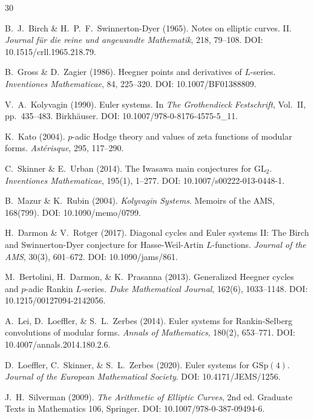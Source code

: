\documentclass[aps,prd,twocolumn,superscriptaddress,nofootinbib]{revtex4-2}
\theoremstyle{definition}
\theoremstyle{remark}
\begin{document}
\begin{thebibliography}{30}

B.~J.~Birch \& H.~P.~F.~Swinnerton-Dyer (1965).
Notes on elliptic curves. II.
\textit{Journal f\"ur die reine und angewandte Mathematik}, 218, 79--108.
DOI: 10.1515/crll.1965.218.79.

B.~Gross \& D.~Zagier (1986).
Heegner points and derivatives of $L$-series.
\textit{Inventiones Mathematicae}, 84, 225--320.
DOI: 10.1007/BF01388809.

V.~A.~Kolyvagin (1990).
Euler systems.
In \textit{The Grothendieck Festschrift}, Vol.~II, pp.\ 435--483. Birkh\"auser.
DOI: 10.1007/978-0-8176-4575-5\_11.

K.~Kato (2004).
$p$-adic Hodge theory and values of zeta functions of modular forms.
\textit{Ast\'erisque}, 295, 117--290.

C.~Skinner \& E.~Urban (2014).
The Iwasawa main conjectures for $\mathrm{GL}_2$.
\textit{Inventiones Mathematicae}, 195(1), 1--277.
DOI: 10.1007/s00222-013-0448-1.

B.~Mazur \& K.~Rubin (2004).
\textit{Kolyvagin Systems}.
Memoirs of the AMS, 168(799).
DOI: 10.1090/memo/0799.

H.~Darmon \& V.~Rotger (2017).
Diagonal cycles and Euler systems II: The Birch and Swinnerton-Dyer conjecture for Hasse-Weil-Artin $L$-functions.
\textit{Journal of the AMS}, 30(3), 601--672.
DOI: 10.1090/jams/861.

M.~Bertolini, H.~Darmon, \& K.~Prasanna (2013).
Generalized Heegner cycles and $p$-adic Rankin $L$-series.
\textit{Duke Mathematical Journal}, 162(6), 1033--1148.
DOI: 10.1215/00127094-2142056.

A.~Lei, D.~Loeffler, \& S.~L.~Zerbes (2014).
Euler systems for Rankin-Selberg convolutions of modular forms.
\textit{Annals of Mathematics}, 180(2), 653--771.
DOI: 10.4007/annals.2014.180.2.6.

D.~Loeffler, C.~Skinner, \& S.~L.~Zerbes (2020).
Euler systems for $\mathrm{GSp}(4)$.
\textit{Journal of the European Mathematical Society}.
DOI: 10.4171/JEMS/1256.

J.~H.~Silverman (2009).
\textit{The Arithmetic of Elliptic Curves}, 2nd ed.
Graduate Texts in Mathematics 106, Springer.
DOI: 10.1007/978-0-387-09494-6.


\end{thebibliography}
\end{document}
